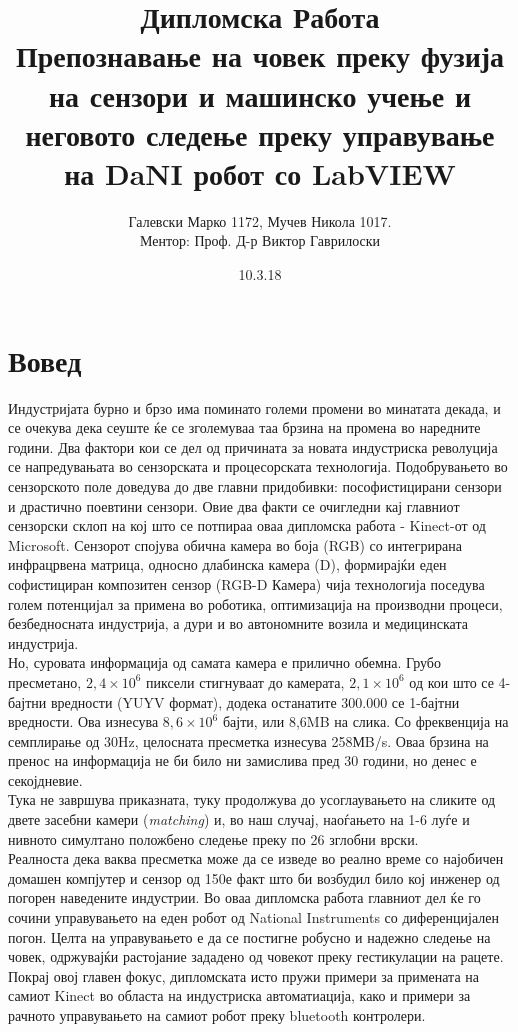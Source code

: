 \documentclass[12pt]{article}
\title{Дипломска Работа\\Препознавање на човек преку фузија на сензори и машинско учење и неговото следење
				преку управување на DaNI робот со LabVIEW}
\date{10.3.18}
\author{Галевски Марко 1172, Мучев Никола 1017.	\\	Ментор: Проф. Д-р Виктор Гаврилоски}
\begin{document}
    \maketitle{}
    \newpage
    \tableofcontents
    \newpage
\section{Вовед}
  Индустријата бурно и брзо има поминато големи промени во минатата декада, и се очекува дека сеуште ќе се зголемуваа таа брзина на промена во наредните години. Два фактори кои се дел од причината за новата индустриска револуција се напредувањата во сензорската и процесорската технологија.\bigbreak
  Подобрувањето во сензорското поле доведува до две главни придобивки: пософистицирани сензори и драстично поевтини сензори. Овие два факти се очигледни кај главниот сензорски склоп на кој што се потпираа оваа дипломска работа - Kinect-от од Microsoft. Сензорот спојува обична камера во боја (RGB) со интегрирана инфрацрвена матрица, односно длабинска камера (D), формирајќи еден софистициран композитен сензор (RGB-D Камера) чија технологија поседува голем потенцијал за примена во роботика, оптимизација на производни процеси, безбедносната индустрија, а дури и во автономните возила и медицинската индустрија.
  \\
  Но, суровата информација од самата камера е прилично обемна. Грубо пресметано, $2,4 \times 10^6$ пиксели стигнуваат до камерата, $2,1 \times 10^6$ од кои што се 4-бајтни вредности (YUYV формат), додека останатите 300.000 се 1-бајтни вредности. Ова изнесува $8,6 \times 10^6$ бајти, или 8,6MB на слика. Со фреквенција на семплирање од 30Hz, целосната пресметка изнесува 258МB/s. Оваа брзина на пренос на информација не би било ни замислива пред 30 години, но денес е секојдневие.
  \\
  Тука не завршува приказната, туку продолжува до усоглаувањето на сликите од двете засебни камери (\textit{matching}) и, во наш случај, наоѓањето на 1-6 луѓе и нивното симултано положбено следење преку по 26 зглобни врски.
  \\
  Реалноста дека ваква пресметка може да се изведе во реално време со најобичен домашен компјутер и сензор од 150\texteuro е факт што би возбудил било кој инженер од погорен наведените индустрии.
\medskip
  Во оваа дипломска работа главниот дел ќе го сочини управувањето на еден робот од National Instruments со диференцијален погон. Целта на управувањето е да се постигне робусно и надежно следење на човек, одржувајќи растојание зададено од човекот преку гестикулации на рацете.
  \\
  Покрај овој главен фокус, дипломската исто пружи примери за примената на самиот Kinect во областа на индустриска автоматиација, како и примери за рачното управувањето на самиот робот преку bluetooth контролери.
\end{document}
